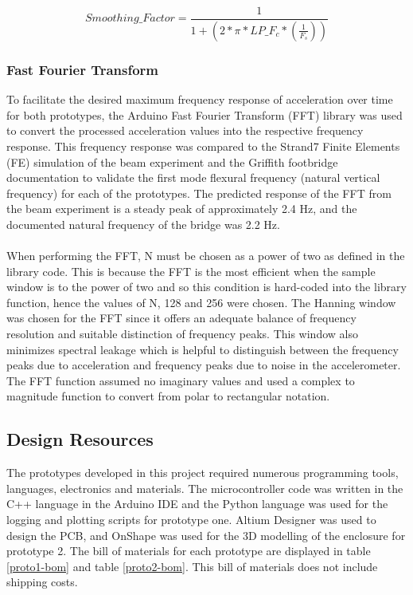 \begin{equation} \label{smoothing-factor}
Smoothing\_Factor = \frac{1}{1 + (2 * \pi * LP\_F_c * (\frac{1}{F_s}))}
\end{equation}

\subsubsection{Fast Fourier Transform}
To facilitate the desired maximum frequency response of acceleration over time for both prototypes, the Arduino Fast Fourier Transform (FFT) library was used to convert the processed acceleration values into the respective frequency response. This frequency response was compared to the Strand7 Finite Elements (FE) simulation of the beam experiment and the Griffith footbridge documentation to validate the first mode flexural frequency (natural vertical frequency) for each of the prototypes. The predicted response of the FFT from the beam experiment is a steady peak of approximately 2.4 Hz, and the documented natural frequency of the bridge was 2.2 Hz.\\\\
When performing the FFT, N must be chosen as a power of two as defined in the library code. This is because the FFT is the most efficient when the sample window is to the power of two and so this condition is hard-coded into the library function, hence the values of N, 128 and 256 were chosen. The Hanning window was chosen for the FFT since it offers an adequate balance of frequency resolution and suitable distinction of frequency peaks. This window also minimizes spectral leakage which is helpful to distinguish between the frequency peaks due to acceleration and frequency peaks due to noise in the accelerometer. The FFT function assumed no imaginary values and used a complex to magnitude function to convert from polar to rectangular notation. 

\subsection{Design Resources}
The prototypes developed in this project required numerous programming tools, languages, electronics and materials. The microcontroller code was written in the C++ language in the Arduino IDE and the Python language was used for the logging and plotting scripts for prototype one. Altium Designer was used to design the PCB, and OnShape was used for the 3D modelling of the enclosure for prototype 2. The bill of materials for each prototype are displayed in table \ref{proto1-bom} and table \ref{proto2-bom}. This bill of materials does not include shipping costs. 

